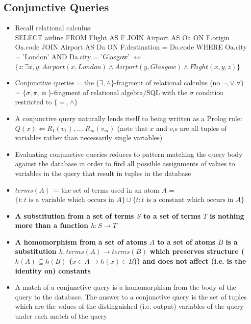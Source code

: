 \documentclass[20pt,a4paper,landscape]{extarticle}
\begin{document}
\begin{flushleft}
\subsection{Conjunctive Queries}
\begin{itemize}
\item Recall relational calculus:\\
SELECT airline FROM Flight AS F JOIN Airport AS Oa ON F.origin = Oa.code JOIN Airport AS Da ON F.destination = Da.code WHERE Oa.city = 'London' AND Da.city = 'Glasgow' $\Leftrightarrow$\\
$\{z: \exists x, y: Airport(x, London) \land Airport(y, Glasgow) \land Flight(x, y, z)\}$
\item Conjunctive queries = the $\{\exists, \land\}$-fragment of relational calculus (no $\neg, \lor. \forall$)\\
= $\{\sigma, \pi, \bowtie\}$-fragment of relational algebra/SQL with the $\sigma$ condition restricted to $\{=, \land\}$
\item A conjunctive query naturally lends itself to being written as a Prolog rule: $Q(x) \Leftarrow R_1(v_1), ..., R_m(v_m)$ (note that $x$ and $v_i$s are all tuples of variables rather than necessarily single variables)
\item Evaluating conjunctive queries reduces to pattern matching the query body against the database in order to find all possible assignments of values to variables in the query that result in tuples in the database
\item \textbf{\boldmath$terms(A)$ =} the set of terms used in an atom $A$ = \textbf{\boldmath$\{t: t\textrm{ is a variable which occurs in }A\} \cup\allowbreak \{t: t\textrm{ is a constant which occurs in }A\}$}
\item \textbf{A substitution from a set of terms \boldmath$S$ to a set of terms $T$ is nothing more than a function \boldmath$h: S \to T$}
\item \textbf{A homomorphism from a set of atoms \boldmath$A$ to a set of atoms $B$ is a substitution $h: terms(A) \to terms(B)$ which preserves structure ($h(A) \subseteq h(B)$ ($x \in A \rightarrow h(x) \in B$)) and does not affect (i.e. is the identity on) constants}
\clearpage
\item A match of a conjunctive query is a homomorphism from the body of the query to the database. The answer to a conjunctive query is the set of tuples which are the values of the distinguished (i.e. output) variables of the query under each match of the query
\end{itemize}
\clearpage

\end{flushleft}
\end{document}
